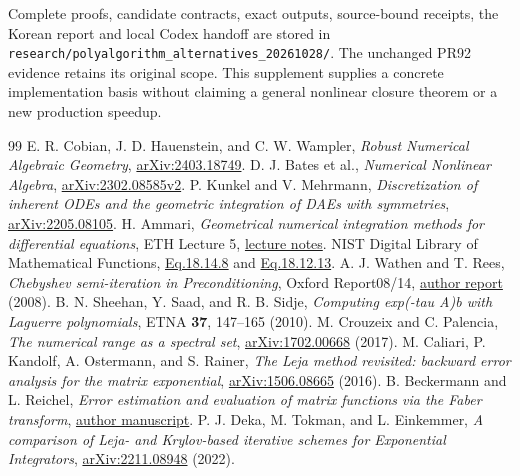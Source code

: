 \documentclass[aps,pra,reprint,onecolumn,11pt,notitlepage,nofootinbib]{revtex4-2}
\begin{document}
Complete proofs, candidate contracts, exact outputs, source-bound receipts,
the Korean report and local Codex handoff are stored in
\texttt{research/polyalgorithm\_alternatives\_20261028/}. The unchanged
PR92 evidence retains its original scope. This supplement supplies a concrete
implementation basis without claiming a general nonlinear closure theorem
or a new production speedup.

\begin{thebibliography}{99}
 E. R. Cobian, J. D. Hauenstein, and C. W. Wampler,
\textit{Robust Numerical Algebraic Geometry},
\href{https://arxiv.org/pdf/2403.18749}{arXiv:2403.18749}.
 D. J. Bates et al., \textit{Numerical Nonlinear Algebra},
\href{https://arxiv.org/html/2302.08585v2}{arXiv:2302.08585v2}.
 P. Kunkel and V. Mehrmann, \textit{Discretization of inherent
ODEs and the geometric integration of DAEs with symmetries},
\href{https://arxiv.org/pdf/2205.08105}{arXiv:2205.08105}.
 H. Ammari, \textit{Geometrical numerical integration methods
for differential equations}, ETH Lecture 5,
\href{https://people.math.ethz.ch/~grsam/FS18/NAII/files/slides/ODE-Lecture5.pdf}{lecture notes}.
 NIST Digital Library of Mathematical Functions,
\href{https://dlmf.nist.gov/18.14.E8}{Eq.18.14.8} and
\href{https://dlmf.nist.gov/18.12.E13}{Eq.18.12.13}.
 A. J. Wathen and T. Rees,
\textit{Chebyshev semi-iteration in Preconditioning}, Oxford Report08/14,
\href{https://www.cs.ox.ac.uk/files/1540/NA-08-14.pdf}{author report} (2008).
 B. N. Sheehan, Y. Saad, and R. B. Sidje,
\textit{Computing exp(-tau A)b with Laguerre polynomials}, ETNA
\textbf{37}, 147--165 (2010).
 M. Crouzeix and C. Palencia,
\textit{The numerical range as a spectral set},
\href{https://arxiv.org/pdf/1702.00668}{arXiv:1702.00668} (2017).
 M. Caliari, P. Kandolf, A. Ostermann, and S. Rainer,
\textit{The Leja method revisited: backward error analysis for the matrix exponential},
\href{https://arxiv.org/pdf/1506.08665}{arXiv:1506.08665} (2016).
 B. Beckermann and L. Reichel,
\textit{Error estimation and evaluation of matrix functions via the Faber transform},
\href{https://pro.univ-lille.fr/fileadmin/user_upload/pages_pros/bernhard_beckermann/abs/paper15.pdf}{author manuscript}.
 P. J. Deka, M. Tokman, and L. Einkemmer,
\textit{A comparison of Leja- and Krylov-based iterative schemes for Exponential Integrators},
\href{https://arxiv.org/pdf/2211.08948}{arXiv:2211.08948} (2022).
\end{thebibliography}
\end{document}
